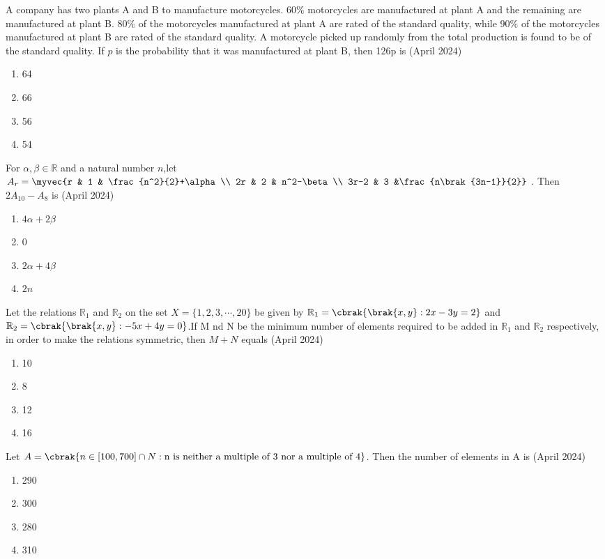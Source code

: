 \iffalse
\title{04-06-2024-shift-1-16-30}
\author{AI24BTECH11011}
\section{mcq-single}
\fi
    \item A company has two plants A and B to manufacture motorcycles. $60\%$ motorcycles are manufactured at plant A and the remaining are manufactured at plant B. $80\%$ of the motorcycles manufactured at plant A are rated of the standard quality, while $90\%$ of the motorcycles manufactured at plant B are rated of the standard quality. A motorcycle picked up randomly from the total production is found to be of the standard quality. If $p$ is the probability that it was manufactured at plant B, then 126p is
  \hfill{(April 2024)}
\begin{enumerate}
        \item 64
        \item 66
        \item 56
        \item 54
    \end{enumerate}
    \item For $\alpha,\beta \in \mathbb{R}$ and a natural number $n$,let $A_r=\myvec{r & 1 & \frac{n^2}{2}+\alpha \\ 2r & 2 & n^2-\beta \\ 3r-2 & 3 &\frac{n\brak{3n-1}}{2}}$ . Then $2A_{10}-A_8$ is
\hfill{(April 2024)} 
\begin{enumerate}
        \item $4\alpha+2\beta$
        \item 0
        \item $2\alpha+4\beta$
        \item $2n$
    \end{enumerate}
    \item Let the relations $\mathbb{R}_1$ and $\mathbb{R}_2$ on the set $X=\{1,2,3,\cdots,20\}$ be given by $\mathbb{R}_1=\cbrak{\brak{x,y}:2x-3y=2}$ and $\mathbb{R}_2=\cbrak{\brak{x,y}:-5x+4y=0}$.If M nd N be the minimum number of elements required to be added in $\mathbb{R}_1$ and $\mathbb{R}_2$ respectively, in order to make the relations symmetric, then $M+N$ equals
\hfill{(April 2024)} 
\begin{enumerate}
        \item 10
        \item 8
        \item 12
        \item 16
    \end{enumerate}
    \item Let $A=\cbrak{n \in [100,700]\cap N :\text{n is neither a multiple of 3 nor a multiple of 4}}$. Then the number of elements in A is 
\hfill{(April 2024)} 
\begin{enumerate}
        \item 290
        \item 300
        \item 280
        \item 310
    \end{enumerate}

